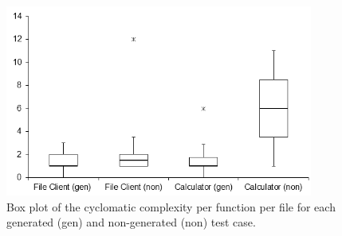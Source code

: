 \begin{figure}[h!]
\centering
\includegraphics[width=0.9\textwidth]{figures/Lizard_CCN.png}
\caption[[Box plot of the cyclomatic complexity per function per file for each generated and non-generated test case.]{Box plot of the cyclomatic complexity per function per file for each generated (gen) and non-generated (non) test case.}
\label{fig:Lizard_CCN}
\end{figure}




